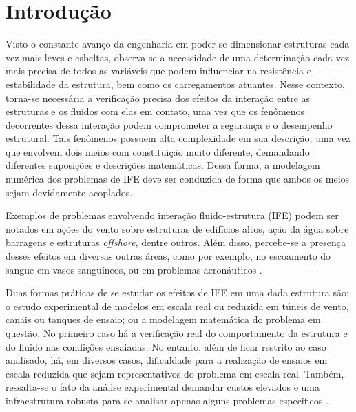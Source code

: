 \chapter{Introdução}


Visto o constante avanço da engenharia em poder se dimensionar estruturas cada vez mais leves e esbeltas, observa-se a necessidade de uma determinação cada vez mais precisa de todos as variáveis que podem influenciar na resistência e estabilidade da estrutura, bem como os carregamentos atuantes. Nesse contexto, torna-se necessária a verificação precisa dos efeitos da interação entre as estruturas e os fluidos com elas em contato, uma vez que os fenômenos decorrentes dessa interação podem comprometer a segurança e o desempenho estrutural. Tais fenômenos possuem alta complexidade em sua descrição, uma vez que envolvem dois meios com constituição muito diferente, demandando diferentes suposições e descrições matemáticas. Dessa forma, a modelagem numérica dos problemas de IFE deve ser conduzida de forma que ambos os meios sejam devidamente acoplados.

Exemplos de problemas envolvendo interação fluido-estrutura (IFE) podem ser notados em ações do vento sobre estruturas de edifícios altos, ação da água sobre barragens e estruturas \textit{offshore}, dentre outros. Além disso, percebe-se a presença desses efeitos em diversas outras áreas, como por exemplo, no escoamento do sangue em vasos sanguíneos, ou em problemas aeronáuticos \cite{sanches2014fluid, fernandes2020tecnica}.

Duas formas práticas de se estudar os efeitos de IFE em uma dada estrutura são: o estudo experimental de modelos em escala real ou reduzida em túneis de vento, canais ou tanques de ensaio; ou a modelagem matemática do problema em questão. No primeiro caso há a verificação real do comportamento da estrutura e do fluido nas condições ensaiadas. No entanto, além de ficar restrito ao caso analisado, há, em diversos casos, dificuldade para a realização de ensaios em escala reduzida que sejam representativos do problema em escala real. Também, ressalta-se o fato da análise experimental demandar custos elevados e uma infraestrutura robusta para se analisar apenas alguns problemas específicos \cite{fernandes2020tecnica}.

